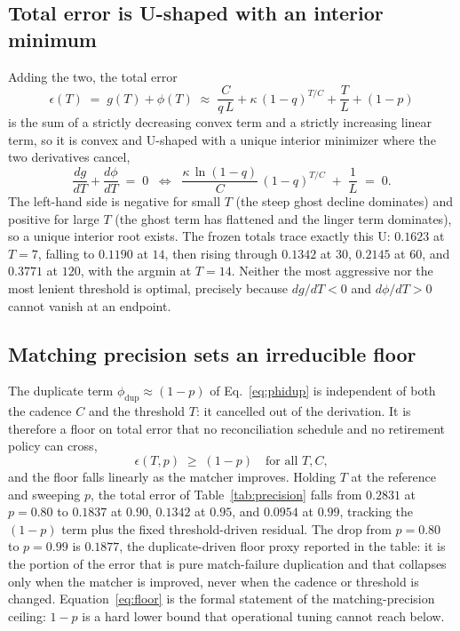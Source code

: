 \documentclass[journal]{IEEEtran}
\begin{document}
\subsection{Total error is U-shaped with an interior minimum}
Adding the two, the total error
\begin{equation}
\epsilon(T) \;=\; g(T) + \phi(T) \;\approx\; \frac{C}{q\,L} + \kappa\,(1 - q)^{T/C}
+ \frac{T}{L} + (1 - p)
\label{eq:epstotal}
\end{equation}
is the sum of a strictly decreasing convex term and a strictly increasing linear term, so it is
convex and U-shaped with a unique interior minimizer where the two derivatives cancel,
\begin{equation}
\frac{dg}{dT} + \frac{d\phi}{dT} \;=\; 0
\;\;\Longleftrightarrow\;\;
\frac{\kappa\,\ln(1-q)}{C}\,(1-q)^{T/C} \;+\; \frac{1}{L} \;=\; 0.
\label{eq:foc}
\end{equation}
The left-hand side is negative for small $T$ (the steep ghost decline dominates) and positive for
large $T$ (the ghost term has flattened and the linger term dominates), so a unique interior root
exists. The frozen totals trace exactly this U: $0.1623$ at $T = 7$, falling to $0.1190$ at $14$,
then rising through $0.1342$ at $30$, $0.2145$ at $60$, and $0.3771$ at $120$, with the argmin at
$T = 14$. Neither the most aggressive nor the most lenient threshold is optimal, precisely because
$dg/dT < 0$ and $d\phi/dT > 0$ cannot vanish at an endpoint.

\subsection{Matching precision sets an irreducible floor}
The duplicate term $\phi_{\text{dup}} \approx (1 - p)$ of Eq.~\eqref{eq:phidup} is independent of
both the cadence $C$ and the threshold $T$: it cancelled out of the derivation. It is therefore a
floor on total error that no reconciliation schedule and no retirement policy can cross,
\begin{equation}
\epsilon(T, p) \;\geq\; (1 - p) \quad\text{for all } T, C,
\label{eq:floor}
\end{equation}
and the floor falls linearly as the matcher improves. Holding $T$ at the reference and sweeping $p$,
the total error of Table~\ref{tab:precision} falls from $0.2831$ at $p = 0.80$ to $0.1837$ at $0.90$,
$0.1342$ at $0.95$, and $0.0954$ at $0.99$, tracking the $(1 - p)$ term plus the fixed
threshold-driven residual. The drop from $p = 0.80$ to $p = 0.99$ is $0.1877$, the
duplicate-driven floor proxy reported in the table: it is the portion of the error that is pure
match-failure duplication and that collapses only when the matcher is improved, never when the
cadence or threshold is changed. Equation~\eqref{eq:floor} is the formal statement of the
matching-precision ceiling: $1 - p$ is a hard lower bound that operational tuning cannot reach below.
\end{document}
